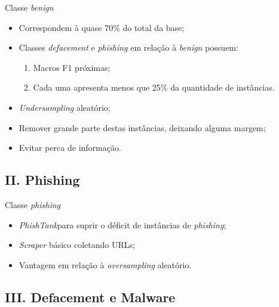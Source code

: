 \documentclass{beamer}
\begin{document}
\begin{frame}{Classe \emph{benign}}

    \begin{itemize}
        \setlength{\itemsep}{10pt}
        \item Correspondem à quase 70\% do total da base;
        \item Classes \emph{defacement} e \emph{phishing} em relação à \emph{benign} possuem:
        \begin{enumerate}
            \vspace{0.2cm}
            \setlength{\itemsep}{10pt}      
            \item Macros F1 próximas;
            \item Cada uma apresenta menos que 25\% da quantidade de instâncias.
        \end{enumerate} 
        \item \emph{Undersampling} aleatório;
        \item Remover grande parte destas instâncias, deixando alguma margem;
        \item Evitar perca de informação.
    \end{itemize}

\end{frame}

\subsection{II. Phishing}

\begin{frame}{Classe \emph{phishing}}

    \begin{itemize}
        \setlength{\itemsep}{10pt}
        \item \emph{PhishTank}\footnotemark para suprir o déficit de instâncias de \emph{phishing};
        \item \emph{Scraper} básico coletando URLs;
        \item Vantagem em relação à \emph{oversampling} aleatório.
    \end{itemize}

    
\end{frame}

\subsection{III. Defacement e Malware}
\end{document}
